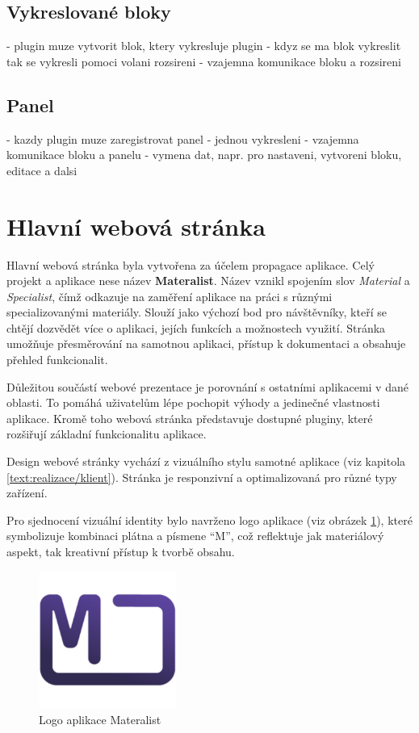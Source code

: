 \subsection{Vykreslované bloky}

- plugin muze vytvorit blok, ktery vykresluje plugin
- kdyz se ma blok vykreslit tak se vykresli pomoci volani rozsireni
- vzajemna komunikace bloku a rozsireni

\subsection{Panel}

- kazdy plugin muze zaregistrovat panel
- jednou vykresleni
- vzajemna komunikace bloku a panelu
- vymena dat, napr. pro nastaveni, vytvoreni bloku, editace a dalsi

\section{Hlavní webová stránka}

 Hlavní webová stránka byla vytvořena za účelem propagace aplikace.
 Celý projekt a aplikace nese název \textbf{Materalist}.
 Název vznikl spojením slov \textit{Material} a \textit{Specialist}, čímž odkazuje na zaměření aplikace na práci s různými specializovanými materiály.
 Slouží jako výchozí bod pro návštěvníky, kteří se chtějí dozvědět více o aplikaci, jejích funkcích a možnostech využití. 
 Stránka umožňuje přesměrování na samotnou aplikaci, přístup k dokumentaci a obsahuje přehled funkcionalit.

Důležitou součástí webové prezentace je porovnání s ostatními aplikacemi v dané oblasti. 
To pomáhá uživatelům lépe pochopit výhody a jedinečné vlastnosti aplikace. 
Kromě toho webová stránka představuje dostupné pluginy, které rozšiřují základní funkcionalitu aplikace.

Design webové stránky vychází z vizuálního stylu samotné aplikace (viz kapitola \ref{text:realizace/klient}). 
Stránka je responzivní a optimalizovaná pro různé typy zařízení.

Pro sjednocení vizuální identity bylo navrženo logo aplikace (viz obrázek \ref{fig:logo}), které symbolizuje kombinaci plátna a písmene \enquote{M}, což reflektuje jak materiálový aspekt, tak kreativní přístup k tvorbě obsahu.

\begin{figure}[ht!]
    \centering
    \includegraphics[width=0.4\textwidth]{media/05_realizace/logo.png}
    \caption{Logo aplikace Materalist}
    \label{fig:logo}
\end{figure}


